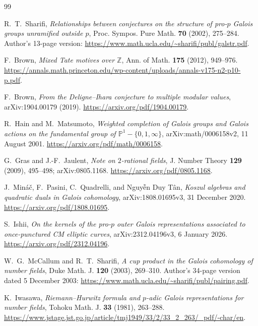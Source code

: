 \documentclass[11pt,a4paper]{article}
\theoremstyle{definition}
\begin{document}
\begin{thebibliography}{99}

R.~T.~Sharifi, \emph{Relationships between conjectures on the structure
of pro-$p$ Galois groups unramified outside $p$},
Proc. Sympos. Pure Math. \textbf{70} (2002), 275--284.
Author's 13-page version: \url{https://www.math.ucla.edu/~sharifi/publ/galstr.pdf}.


F.~Brown, \emph{Mixed Tate motives over $\mathbb Z$},
Ann. of Math. \textbf{175} (2012), 949--976.
\url{https://annals.math.princeton.edu/wp-content/uploads/annals-v175-n2-p10-p.pdf}.


F.~Brown, \emph{From the Deligne--Ihara conjecture to multiple modular values},
arXiv:1904.00179 (2019).
\url{https://arxiv.org/pdf/1904.00179}.


R.~Hain and M.~Matsumoto, \emph{Weighted completion of Galois groups
and Galois actions on the fundamental group of $\mathbb P^1-\{0,1,\infty\}$},
arXiv:math/0006158v2, 11 August 2001.
\url{https://arxiv.org/pdf/math/0006158}.


G.~Gras and J.-F.~Jaulent, \emph{Note on $2$-rational fields},
J. Number Theory \textbf{129} (2009), 495--498;
arXiv:0805.1168.
\url{https://arxiv.org/pdf/0805.1168}.


J.~Min\'a\v c, F.~Pasini, C.~Quadrelli, and Nguy{\~{\^e}}n Duy T\^an,
\emph{Koszul algebras and quadratic duals in Galois cohomology},
arXiv:1808.01695v3, 31 December 2020.
\url{https://arxiv.org/pdf/1808.01695}.


S.~Ishii, \emph{On the kernels of the pro-$p$ outer Galois representations
associated to once-punctured CM elliptic curves},
arXiv:2312.04196v3, 6 January 2026.
\url{https://arxiv.org/pdf/2312.04196}.


W.~G.~McCallum and R.~T.~Sharifi,
\emph{A cup product in the Galois cohomology of number fields},
Duke Math. J. \textbf{120} (2003), 269--310.
Author's 34-page version dated 5 December 2003:
\url{https://www.math.ucla.edu/~sharifi/publ/pairing.pdf}.


K.~Iwasawa, \emph{Riemann--Hurwitz formula and $p$-adic Galois
representations for number fields},
Tohoku Math. J. \textbf{33} (1981), 263--288.
\url{https://www.jstage.jst.go.jp/article/tmj1949/33/2/33_2_263/_pdf/-char/en}.



\end{thebibliography}
\end{document}
